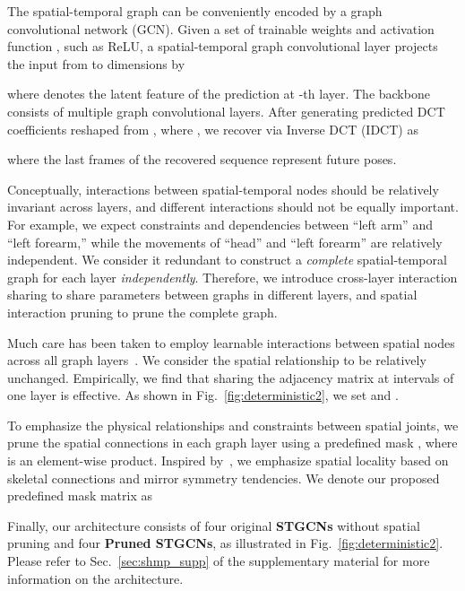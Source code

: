 The spatial-temporal graph can be conveniently encoded by a graph convolutional network (GCN). Given a set of trainable weights  and activation function , such as ReLU, a spatial-temporal graph convolutional layer projects the input from  to  dimensions by

where  denotes the latent feature of the prediction  at -th layer. 
The backbone consists of multiple graph convolutional layers. After generating predicted DCT coefficients  reshaped from , where , we recover  via Inverse DCT (IDCT) as

where the last  frames of the recovered sequence represent future poses.

Conceptually, interactions between spatial-temporal nodes should be relatively invariant across layers, and different interactions should not be equally important. For example, we expect constraints and dependencies between ``left arm'' and ``left forearm,'' while the movements of ``head'' and ``left forearm'' are relatively independent.
We consider it redundant to construct a {\em complete} spatial-temporal graph for each layer {\em independently}. Therefore, we introduce cross-layer interaction sharing to share parameters between graphs in different layers, and spatial interaction pruning to prune the complete graph.

Much care has been taken to employ learnable interactions between spatial nodes across all graph layers~\cite{Sofianos_2021_ICCV,wei2019motion,yan2021dmsgcn}.
We consider the spatial relationship to be relatively unchanged. Empirically, we find that sharing the adjacency matrix at intervals of one layer is effective. As shown in Fig.~\ref{fig:deterministic2}, we set  and .

To emphasize the physical relationships and constraints between spatial joints, we prune the spatial connections  in each graph layer  using a predefined mask , where  is an element-wise product.
Inspired by~\cite{Liu_2021_ICCV}, we emphasize spatial locality based on skeletal connections and mirror symmetry tendencies. We denote our proposed predefined mask matrix as


Finally, our architecture consists of four original \textbf{STGCNs} without spatial pruning and four \textbf{Pruned STGCNs}, as illustrated in Fig.~\ref{fig:deterministic2}. Please refer to Sec.~\ref{sec:shmp_supp} of the supplementary material for more information on the architecture.
